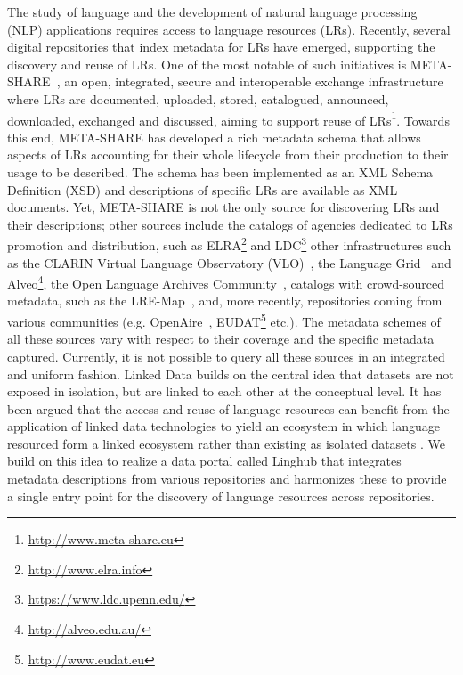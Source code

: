 \documentclass[smallextended]{svjour3}       %
\begin{document}
The study of language and the development of natural language processing (NLP)
applications requires access to language resources (LRs). Recently, several
digital repositories that index metadata for LRs have emerged, supporting the
discovery and reuse of LRs. One of the most notable of such initiatives is
META-SHARE~\cite{federmann2012meta}, an open, integrated, secure and interoperable exchange
infrastructure where LRs are documented, uploaded, stored, catalogued,
announced, downloaded, exchanged and discussed, aiming to support reuse of
LRs\footnote{\url{http://www.meta-share.eu}}. Towards this end, META-SHARE has developed a rich
metadata schema that allows aspects of LRs accounting for their whole lifecycle
from their production to their usage to be described. The schema has been
implemented as an XML Schema Definition (XSD) and descriptions of specific LRs
are available as XML documents. Yet, META-SHARE is not the only source for
discovering LRs and their descriptions; other sources include the catalogs of
agencies dedicated to LRs promotion and distribution, such as
ELRA\footnote{\url{http://www.elra.info}} and
LDC\footnote{\url{https://www.ldc.upenn.edu/}}
other infrastructures such as the CLARIN Virtual Language Observatory
(VLO)~\cite{van2012semantic}, the Language Grid~\cite{ishida2006language} and
Alveo\footnote{\url{http://alveo.edu.au/}}, the Open Language Archives
Community~\cite[OLAC]{simons2003open}, catalogs with crowd-sourced metadata,
such as the LRE-Map~\cite{calzolari2012lre}, and,
more recently, repositories coming from various communities (e.g.
OpenAire~\cite{manghi2010infrastructure},
EUDAT\footnote{\url{http://www.eudat.eu}} etc.). The metadata schemes of all these sources vary with respect to
their coverage and the specific metadata captured. Currently, it is not
possible to query all these sources in an integrated and uniform fashion. 
Linked Data builds on the central idea that datasets are not exposed in
isolation, but are linked to each other at the conceptual level. 
It has been argued that the access and reuse of language resources can benefit
from the application of linked data technologies to yield an ecosystem in which
language resourced form a linked ecosystem rather than existing as isolated
datasets \cite{chiarcos2013towards}. We build on this idea to realize a data portal called Linghub
that integrates metadata descriptions from various repositories and harmonizes
these to provide a single entry point for the discovery of language resources
across repositories. 
\end{document}
